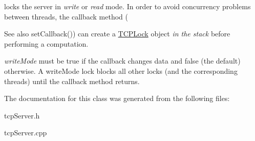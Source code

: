 locks the server in {\itshape write} or {\itshape read} mode. In order to avoid concurrency problems between threads, the callback method ( 

\begin{DoxySeeAlso}{See also}
set\+Callback()) can create a \hyperlink{classcppu_1_1TCPLock}{T\+C\+P\+Lock} object {\itshape in the stack} before performing a computation.
\end{DoxySeeAlso}
{\itshape write\+Mode} must be true if the callback changes data and false (the default) otherwise. A write\+Mode lock blocks all other locks (and the corresponding threads) until the callback method returns. 

The documentation for this class was generated from the following files\+:\begin{DoxyCompactItemize}
\item 
tcp\+Server.\+h\item 
tcp\+Server.\+cpp\end{DoxyCompactItemize}

